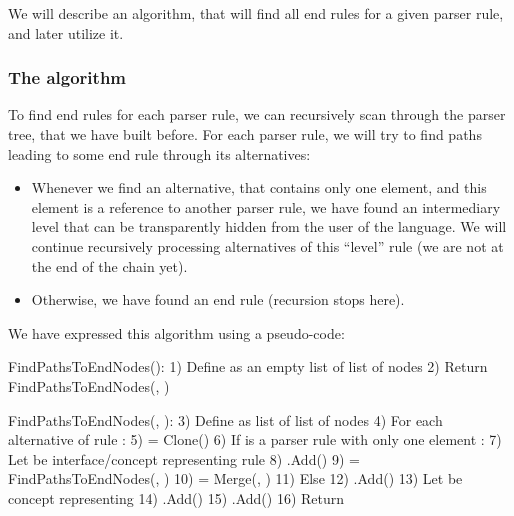 We will describe an algorithm, that will find all end rules for a given parser rule, and later utilize it.

\subsubsection{The algorithm}
To find end rules for each parser rule, we can recursively scan through the parser tree, that we have built before. For each parser rule, we will try to find paths leading to some end rule through its alternatives:

\begin{itemize}
	\item Whenever we find an alternative, that contains only one element, and this element is a reference to another parser rule, we have found an intermediary level that can be transparently hidden from the user of the language. 
	We will continue recursively processing alternatives of this “level” rule (we are not at the end of the chain yet).

	\item Otherwise, we have found an end rule (recursion stops here).
\end{itemize}

We have expressed this algorithm using a pseudo-code:

\label{chap:shortcut_algorithm}
\begin{antlr}
	FindPathsToEndNodes():
	1)  Define  as an empty list of list of nodes
	2)  Return FindPathsToEndNodes(, )
	
	FindPathsToEndNodes(, ):
	3)  Define  as list of list of nodes
	4)  For each alternative  of rule :
	5)       = Clone()
	6)      If  is a parser rule with only one element :
	7)          Let  be interface/concept representing rule 
	8)          .Add()
	9)           = FindPathsToEndNodes(, )
	10)           = Merge(, )
	11)      Else
	12)          .Add()
	13)          Let  be concept representing 
	14)          .Add()
	15)          .Add()
	16)  Return 
\end{antlr}

